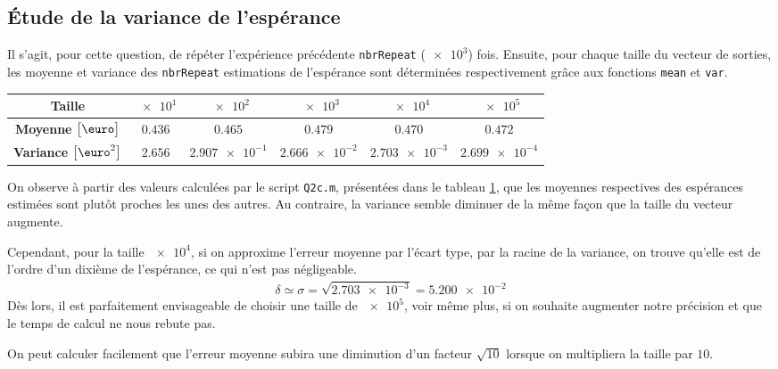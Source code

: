 \documentclass[a4paper, 12pt]{article}
\begin{document}
	\subsection{Étude de la variance de l'espérance}
	Il s'agit, pour cette question, de répéter l'expérience précédente \texttt{nbrRepeat} (\cad $\num{e3}$) fois. Ensuite, pour chaque taille du vecteur de sorties, les moyenne et variance des \texttt{nbrRepeat} estimations de l'espérance sont déterminées respectivement grâce aux fonctions \texttt{mean} et \texttt{var}.
	\begin{table}[H]
		\centering
		\begin{tabular}{|c|c|c|c|c|c|}
			\hline
			              \textbf{Taille}                &  $\num{e1}$   &    $\num{e2}$    &    $\num{e3}$    &    $\num{e4}$    &    $\num{e5}$    \\ \hline\hline
			 \textbf{Moyenne} $\big[\text{\euro}\big]$   & $\num{0.436}$ &  $\num{0.465}$   &  $\num{0.479}$   &  $\num{0.470}$   &  $\num{0.472}$   \\ \hline
			\textbf{Variance} $\big[\text{\euro}^2\big]$ & $\num{2.656}$ & $\num{2.907e-1}$ & $\num{2.666e-2}$ & $\num{2.703e-3}$ & $\num{2.699e-4}$ \\ \hline
		\end{tabular}
		\label{table: Q2c}
	\end{table}
	On observe à partir des valeurs calculées par le script \texttt{Q2c.m}, présentées dans le tableau \ref{table: Q2c}, que les moyennes respectives des espérances estimées sont plutôt proches les unes des autres. Au contraire, la variance semble diminuer de la même façon que la taille du vecteur augmente. \par 
	Cependant, pour la taille $\num{e4}$, si on approxime l'erreur moyenne par l'écart type, \cad par la racine de la variance, on trouve qu'elle est de l'ordre d'un dixième de l'espérance, ce qui n'est pas négligeable.
	\begin{align*}
	    \delta \simeq \sigma = \sqrt{\num{2.703e-3}} = \num{5.200e-2}
	\end{align*}
	Dès lors, il est parfaitement envisageable de choisir une taille de $\num{e5}$, voir même plus, si on souhaite augmenter notre précision et que le temps de calcul ne nous rebute pas. \par
	On peut calculer facilement que l'erreur moyenne subira une diminution d'un facteur $\sqrt{10}$ lorsque on multipliera la taille par $10$.
\end{document}
